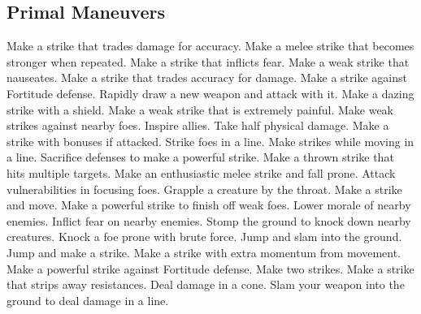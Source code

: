 \subsection{Primal Maneuvers}\label{Primal Maneuvers}
\begin{spelllist}
 Make a strike that trades damage for accuracy.
 Make a melee strike that becomes stronger when repeated.
 Make a strike that inflicts fear.
 Make a weak strike that nauseates.
 Make a strike that trades accuracy for damage.
 Make a strike against Fortitude defense.
 Rapidly draw a new weapon and attack with it.
 Make a dazing strike with a shield.
 Make a weak strike that is extremely painful.
 Make weak strikes against nearby foes.
 Inspire allies.
 Take half physical damage.
 Make a strike with bonuses if attacked.
 Strike foes in a line.
 Make strikes while moving in a line.
 Sacrifice defenses to make a powerful strike.
 Make a thrown strike that hits multiple targets.
 Make an enthusiastic melee strike and fall prone.
 Attack vulnerabilities in focusing foes.
 Grapple a creature by the throat.
 Make a strike and move.
 Make a powerful strike to finish off weak foes.
 Lower morale of nearby enemies.
 Inflict fear on nearby enemies.
 Stomp the ground to knock down nearby creatures.
 Knock a foe prone with brute force.
 Jump and slam into the ground.
 Jump and make a strike.
 Make a strike with extra momentum from movement.
 Make a powerful strike against Fortitude defense.
 Make two strikes.
 Make a strike that strips away resistances.
 Deal damage in a cone.
 Slam your weapon into the ground to deal damage in a line.

\end{spelllist}

